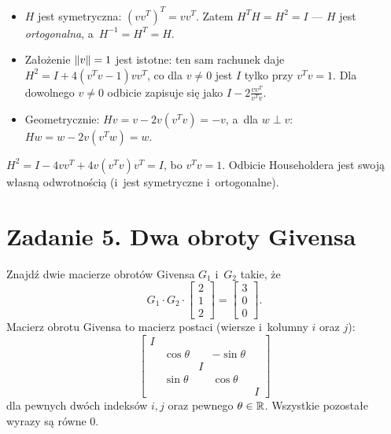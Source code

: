 \documentclass[11pt]{article}
\begin{document}
\begin{uwaga}
\begin{itemize}
\item $H$ jest symetryczna: $(vv^T)^T=vv^T$. Zatem $H^TH=H^2=I$ ---
$H$ jest \emph{ortogonalna}, a~$H^{-1}=H^T=H$.
\item Założenie $\left\lVert v \right\rVert=1$ jest istotne: ten sam rachunek daje
$H^2=I+4(v^Tv-1)vv^T$, co dla $v\ne0$ jest $I$ tylko przy $v^Tv=1$.
Dla dowolnego $v\ne0$ odbicie zapisuje się jako
$I-2\frac{vv^T}{v^Tv}$.
\item Geometrycznie: $Hv=v-2v(v^Tv)=-v$, a~dla $w\perp v$:
$Hw=w-2v(v^Tw)=w$.
\end{itemize}
\end{uwaga}

\begin{odpowiedz}
$H^2=I-4vv^T+4v(v^Tv)v^T=I$, bo $v^Tv=1$. Odbicie Householdera jest
swoją własną odwrotnością (i~jest symetryczne i~ortogonalne).
\end{odpowiedz}

\section{Zadanie 5. Dwa obroty Givensa}
\begin{tresc}
Znajdź dwie macierze obrotów Givensa $G_1$ i~$G_2$ takie, że
\[
G_1\cdot G_2\cdot\begin{bmatrix}2\\1\\2\end{bmatrix}
=\begin{bmatrix}3\\0\\0\end{bmatrix}.
\]
Macierz obrotu Givensa to macierz postaci (wiersze i~kolumny $i$ oraz $j$):
\[
\begin{bmatrix}
I&&&&\\
&\cos\theta&&-\sin\theta&\\
&&I&&\\
&\sin\theta&&\cos\theta&\\
&&&&I
\end{bmatrix}
\]
dla pewnych dwóch indeksów $i,j$ oraz pewnego $\theta\in\mathbb{R}$. Wszystkie
pozostałe wyrazy są równe $0$.
\end{tresc}
\end{document}
